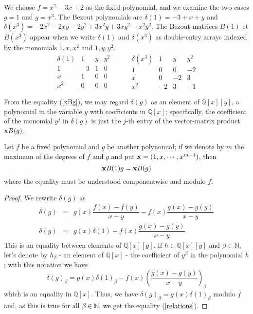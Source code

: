 \documentclass{standalone}
\begin{document}
\begin{exmp}
\label{exmp_1}
We choose $f = x^2 - 3x + 2$ as the fixed polynomial, and we examine the two cases $g=1$ and $g = x^3$. 
The Bezout polynomials are $\delta(1) = -3 + x + y$ and $\delta(x^3) = -2x^2 - 2xy -2y^2 + 3x^2y + 3xy^2 -x^2y^2$. 
The Bezout matrices $B(1)$ et $B(x^3)$ appear when we write  $\delta(1)$ and  $\delta(x^3)$ as double-entry arrays indexed by the monomials $1, x, x^2$ and $1, y, y^2$.
$$
\begin{array}{c|ccc}
\delta(1) & 1 & y & y^2\\
\hline
1 & -3 & 1 & 0\\
x & 1 & 0 & 0\\
x^2 & 0 & 0 & 0
\end{array}
\hspace{1cm}
\begin{array}{c|ccc}
\delta(x^3) & 1 & y & y^2\\
\hline
1 & 0 & 0 & -2\\
x & 0 & -2 & 3\\
x^2 & -2 & 3 & -1
\end{array}
$$
\end{exmp}

From the equality (\ref{xBg}), we may regard $\delta(g)$ as an element of $\mathbb{Q}[x][y]$, a polynomial in the variable $y$ with coefficients in $\mathbb{Q}[x]$; 
specifically, the coefficient of the monomial $y^j$ in $\delta(g)$ is just the $j$-th entry of the vector-matrix product $\bold{x} B(g)$.


\begin{prop}
\label{relations_prop}
Let $f$ be a fixed polynomial and $g$ be another polynomial; if we denote by $m$ the maximum of the degrees of $f$ and $g$ and put $\bold{x} = (1, x,\cdots, x^{m-1})$, then
\begin{equation}
\label{relations}
	\bold{x}B(1)g = \bold{x}B(g)
\end{equation}
where the equality must be understood componentwise and modulo $f$.
\end{prop}
\begin{proof}
We rewrite $\delta(g)$ as
\begin{align*}
	\delta(g) & = & g(x)\dfrac{f(x)-f(y)}{x-y} - f(x)\dfrac{g(x)-g(y)}{x-y} \\ \nonumber
	\delta(g) & = & g(x)\delta(1) - f(x)\dfrac{g(x)-g(y)}{x-y}
\end{align*}
This is an equality between elements of $\mathbb{Q}[x][y]$. 
If $h\in \mathbb{Q}[x][y]$ and $\beta\in\mathbb{N}$, let's denote by $h_\beta$ - an element of $\mathbb{Q}[x]$ - the coefficient of $y^\beta$ in the polynomial $h$; 
with this notation we have
$$\delta(g)_\beta = g(x)\delta(1)_\beta - f(x)\left(\dfrac{g(x)-g(y)}{x-y}\right)_\beta$$
which is an equality in $\mathbb{Q}[x]$. Thus, we have $\delta(g)_\beta = g(x)\delta(1)_\beta$ modulo $f$ and, as this is true for all $\beta\in\mathbb{N}$, we get the equality (\ref{relations}).
\end{proof}
\end{document}
